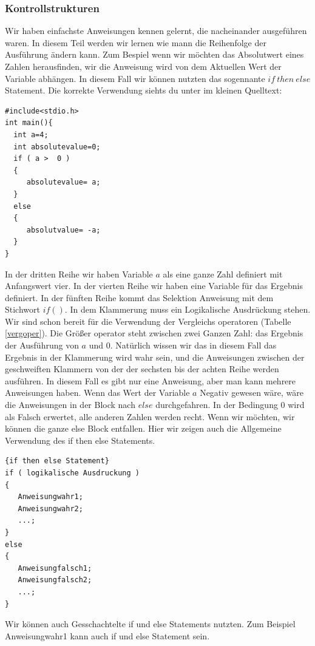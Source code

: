 \documentclass{article}[12pt]
\begin{document}
\subsubsection{Kontrollstrukturen}

Wir haben einfachste Anweisungen kennen gelernt, die nacheinander ausgeführen waren. In diesem Teil werden wir lernen wie mann die Reihenfolge 
der Ausführung ändern kann. Zum Bespiel wenn wir möchten das Absolutwert  eines Zahlen herausfinden, wir die Anweisung wird von dem Aktuellen Wert
der Variable abhängen. In diesem Fall wir können nutzten das sogennante $if~then~else$ Statement. Die korrekte Verwendung siehts du unter im
kleinen Quelltext:
\begin{lstlisting}
#include<stdio.h>
int main(){
  int a=4;
  int absolutevalue=0;
  if ( a >  0 )
  {
     absolutevalue= a;
  }
  else
  {
     absolutvalue= -a;
  }
}
\end{lstlisting}
In der dritten  Reihe wir haben Variable $a$ als eine ganze Zahl definiert mit Anfangswert vier. In der vierten Reihe wir haben eine
Variable für das Ergebnis definiert. In der fünften Reihe kommt das Selektion Anweisung mit dem Stichwort $if ()$. In dem 
Klammerung muss ein Logikalische Ausdrückung stehen. Wir sind schon bereit für die Verwendung der Vergleichs operatoren (Tabelle \ref{vergoper}). 
Die Größer operator steht zwischen zwei Ganzen Zahl: das Ergebnis der Ausführung von $a$ und $0$. Natürlich wissen wir das in diesem Fall das
Ergebnis in der Klammerung wird wahr sein, und die  Anweisungen  zwischen  der geschweiften Klammern von der der sechsten bis der
achten Reihe werden ausführen. In diesem Fall es gibt nur eine Anweisung, aber man kann mehrere Anweisungen haben. Wenn das
Wert der Variable $a$ Negativ gewesen wäre, wäre die Anweisungen in der Block nach $else$ durchgefahren. In der Bedingung
0 wird als Falsch erwertet, alle anderen Zahlen werden recht. Wenn wir möchten, wir
können die ganze else Block entfallen. Hier wir zeigen auch die Allgemeine Verwendung des if then else Statements.

\begin{lstlisting}{if then else Statement}
if ( logikalische Ausdruckung )
{
   Anweisungwahr1;
   Anweisungwahr2;
   ...;
}
else
{
   Anweisungfalsch1;
   Anweisungfalsch2;
   ...;
}
\end{lstlisting}
Wir können auch Gesschachtelte if und else Statements nutzten. Zum Beispiel Anweisungwahr1 kann auch if und else Statement sein.
\end{document}

